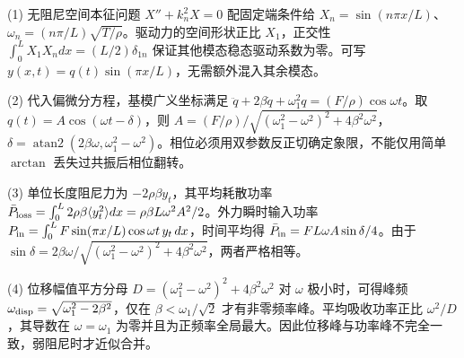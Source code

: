 (1) 无阻尼空间本征问题 \(X''+k_n^2X=0\) 配固定端条件给 \(X_n=\sin(n\pi x/L)\)、\(\omega_n=(n\pi/L)\sqrt{T/\rho}\)。驱动力的空间形状正比 \(X_1\)，正交性 \(\int_0^L X_1X_n dx=(L/2)\delta_{1n}\) 保证其他模态稳态驱动系数为零。可写 \(y(x,t)=q(t)\sin(\pi x/L)\)，无需额外混入其余模态。

(2) 代入偏微分方程，基模广义坐标满足 \(\ddot q+2\beta\dot q+\omega_1^2q=(F/\rho)\cos\omega t\)。取 \(q(t)=A\cos(\omega t-\delta)\)，则 \(A=(F/\rho)/\sqrt{(\omega_1^2-\omega^2)^2+4\beta^2\omega^2}\)，\(\delta=\operatorname{atan2}(2\beta\omega,\omega_1^2-\omega^2)\)。相位必须用双参数反正切确定象限，不能仅用简单 \(\arctan\) 丢失过共振后相位翻转。

(3) 单位长度阻尼力为 \(-2\rho\beta y_t\)，其平均耗散功率 \(\bar P_{\rm loss}=\int_0^L2\rho\beta\langle y_t^2\rangle dx=\rho\beta L\omega^2A^2/2\)。外力瞬时输入功率 \(P_{\rm in}=\int_0^L F\sin(\pi x/L)\cos\omega t\,y_t\,dx\)，时间平均得 \(\bar P_{\rm in}=FL\omega A\sin\delta/4\)。由于 \(\sin\delta=2\beta\omega/\sqrt{(\omega_1^2-\omega^2)^2+4\beta^2\omega^2}\)，两者严格相等。

(4) 位移幅值平方分母 \(D=(\omega_1^2-\omega^2)^2+4\beta^2\omega^2\) 对 \(\omega\) 极小时，可得峰频 \(\omega_{\rm disp}=\sqrt{\omega_1^2-2\beta^2}\)，仅在 \(\beta<\omega_1/\sqrt2\) 才有非零频率峰。平均吸收功率正比 \(\omega^2/D\)，其导数在 \(\omega=\omega_1\) 为零并且为正频率全局最大。因此位移峰与功率峰不完全一致，弱阻尼时才近似合并。
